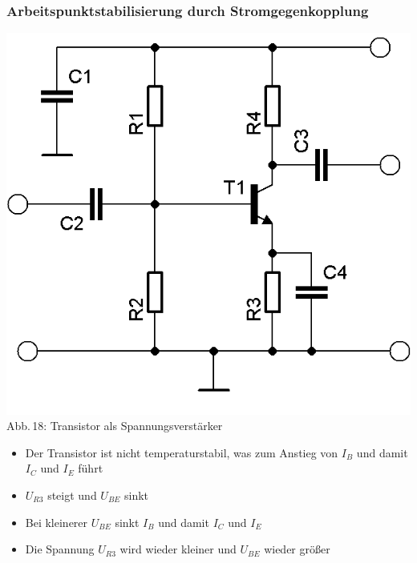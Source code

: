 \begin{frame}
  \frametitle{Arbeitspunktstabilisierung durch Stromgegenkopplung}
  \begin{minipage}{0.4\textwidth}
    \begin{center}
      \includegraphics[width=\textwidth,height=.85\textheight,keepaspectratio]{a06/Transistor-Verstaerker-APstab1.png}\\
      {\tiny Abb.\,18: Transistor als Spannungsverstärker~\cite{bnetza}}
    \end{center}
  \end{minipage}
  \hspace{3mm}
  \begin{minipage}{0.5\textwidth}
    \begin{itemize}
      \item Der Transistor ist nicht temperaturstabil, was zum Anstieg von $I_B$ und damit $I_C$ und $I_E$ führt
      \item $U_{R3}$ steigt und $U_{BE}$ sinkt
      \item Bei kleinerer $U_{BE}$ sinkt $I_B$ und damit $I_C$ und $I_E$
      \item Die Spannung $U_{R3}$ wird wieder kleiner und $U_{BE}$ wieder größer
    \end{itemize}
  \end{minipage}
\end{frame}

